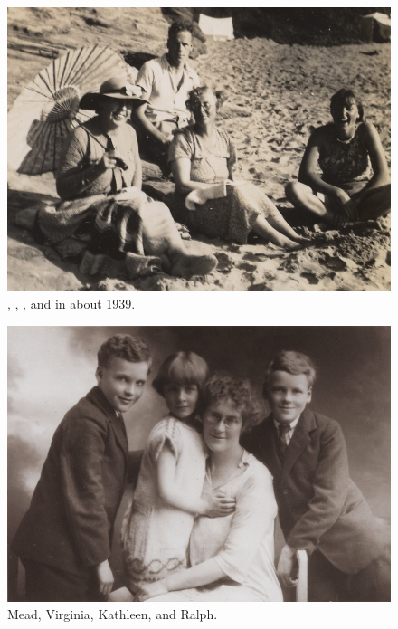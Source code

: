\begin{figure}
\centering
\includegraphics{photos/Barker_family_c1939}
\caption{, , , and  in about 1939.}
\end{figure}

\begin{figure}
\centering
\includegraphics{photos/Mead_Virginia_Kathleen_and_Ralph.png}
\caption{Mead, Virginia, Kathleen, and Ralph.}
\end{figure}
